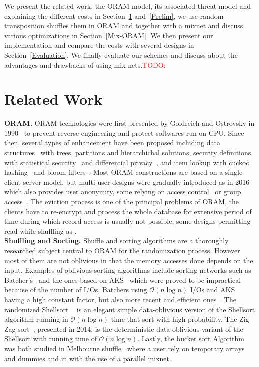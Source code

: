 \documentclass{llncs}
\newcommand{\todo}[1]{\textcolor{red}{TODO: #1}}
\begin{document}
We present the related work, the ORAM model, its associated threat model and explaining the different costs in Section~\ref{Related} and~\ref{Prelim}, we use random transposition shuffles them in ORAM and together with a mixnet and discuss various optimizations in Section~\ref{Mix-ORAM}. We then present our implementation and compare the costs with several designs in Section~\ref{Evaluation}.
We finally evaluate our schemes and discuss about the advantages and drawbacks of using mix-nets.\todo{}
%

\section{Related Work}\label{Related}
\noindent\textbf{ORAM.}
ORAM technologies were first presented by Goldreich and Ostrovsky in 1990~\cite{ostrovsky1990efficient} to prevent reverse engineering and protect softwares run on CPU.
Since then, several types of enhancement have been proposed including data structures~\cite{goldreich1996software,stefanov2011towards,stefanov2013path,ren2014ring} with trees, partitions and hierarchichal solutions,
security definitions with statistical security~\cite{damgaard2011perfectly,ajtai2010oblivious} and differential privacy~\cite{wagh2016root}, and item lookup with cuckoo hashing~\cite{pinkas2010oblivious} and bloom filters~\cite{williams2008building}.
Most ORAM constructions are based on a single client server model, but multi-user designs were gradually introduced as \cite{backesanonymous} in 2016 which also provides user anonymity, some relying on access control~\cite{franz2011oblivious} or group access~\cite{goodrich2012privacy}.
The eviction process is one of the principal problems of ORAM, the clients have to re-encrypt and process the whole database for extensive period of time during which record access is usually not possible, some designs permitting read while shuffling as \cite{boneh2011}.\\

\noindent\textbf{Shuffling and Sorting.}
Shuffle and sorting algorithms are a thoroughly researched subject central to ORAM for the randomization process. However most of them are not oblivious in that the memory accesses done depends on the input.
Examples of oblivious sorting algorithms include sorting networks such as Batcher's~\cite{batcher1968sorting} and the ones based on AKS~\cite{ajtai19830} which were proved to be impractical because of the number of I/Os, Batchers using $\mathcal{O}\left ( n \log n \right)$ I/Os and AKS having a high constant factor, but also more recent and efficient ones~\cite{paterson1990improved}.
The randomized Shellsort ~\cite{goodrich2010randomized} is an elegant simple data-oblivious version of the Shellsort algorithm running in $\mathcal{O}\left ( n \log n \right)$ time that sort with high probability.
The Zig Zag sort~\cite{goodrich2014zig}, presented in 2014, is the deterministic data-oblivious variant of the Shellsort with running time of $\mathcal{O}\left ( n \log n\right)$.
Lastly, the bucket sort Algorithm was both studied in Melbourne shuffle~\cite{ohrimenko2014melbourne} where a user rely on temporary arrays and dummies and in \cite{goodrich2012anonymous} with the use of a parallel mixnet.\\
\end{document}
